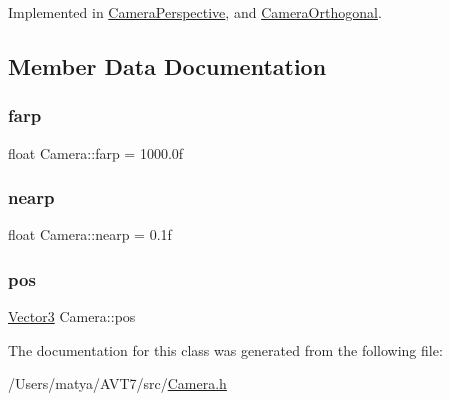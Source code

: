 Implemented in \hyperlink{class_camera_perspective_a6605f8288ea01b0d647213df88d2a45b}{Camera\+Perspective}, and \hyperlink{class_camera_orthogonal_aba42e2f1ce347576e6ab83e45a8d7ed9}{Camera\+Orthogonal}.



\subsection{Member Data Documentation}
\mbox{\label{class_camera_ae19883a49359025f85d96d20c774fe4b}} 
\subsubsection{\texorpdfstring{farp}{farp}}
{\footnotesize\ttfamily float Camera\+::farp = 1000.\+0f}

\mbox{\label{class_camera_a838139083987e3ede449183558e2bd61}} 
\subsubsection{\texorpdfstring{nearp}{nearp}}
{\footnotesize\ttfamily float Camera\+::nearp = 0.\+1f}

\mbox{\label{class_camera_a2c4c5bcf8f5885968d4e5ebc28074846}} 
\subsubsection{\texorpdfstring{pos}{pos}}
{\footnotesize\ttfamily \hyperlink{class_vector3}{Vector3} Camera\+::pos}



The documentation for this class was generated from the following file\+:\begin{DoxyCompactItemize}
\item 
/\+Users/matya/\+A\+V\+T7/src/\hyperlink{_camera_8h}{Camera.\+h}\end{DoxyCompactItemize}
